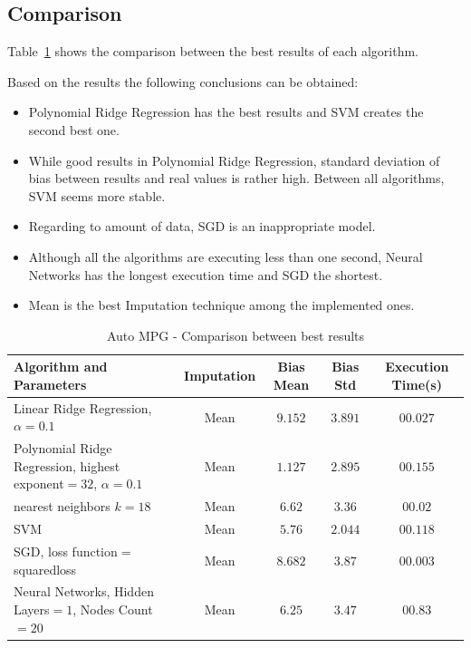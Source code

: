 \subsection{Comparison}
Table~\ref{table:db1-results} shows the comparison between the best results of each algorithm.

Based on the results the following conclusions can be obtained:
\begin{itemize}
  \item Polynomial Ridge Regression has the best results and SVM creates the second best one.
  \item While good results in Polynomial Ridge Regression, standard deviation of bias between results and real values is rather high. Between all algorithms, SVM seems more stable.
  \item Regarding to amount of data, SGD is an inappropriate model.
  \item Although all the algorithms are executing less than one second, Neural Networks has the longest execution time and SGD the shortest.
  \item Mean is the best Imputation technique among the implemented ones.
\end{itemize}

		\begin{table}
\begin{center}
\begin{tabular}{|p{4cm}|c|c|c|c|}
\hline Algorithm and Parameters & Imputation & Bias Mean & Bias Std & Execution Time(s)\\

\hline Linear Ridge Regression, $\alpha=0.1$ & Mean & $9.152$ & $3.891$ & $00.027$ \\

\hline Polynomial Ridge Regression, highest exponent$=32$, $\alpha=0.1$ & Mean & $\mathbf{1.127}$ & $2.895$ & $00.155$  \\

\hline nearest neighbors $k=18$ & Mean & $6.62$ & $3.36$ & $00.02$  \\

\hline SVM & Mean & $5.76$ & $\mathbf{2.044}$ & $00.118$  \\

\hline SGD, loss function$=$squaredloss & Mean & $8.682$ & $3.87$ & $\mathbf{00.003}$  \\

\hline Neural Networks, Hidden Layers$=1$, Nodes Count$=20$ & Mean & $6.25$ & $3.47$ & $00.83$  \\

\hline
\end{tabular}
    \caption{Auto MPG - Comparison between best results}
    \label{table:db1-results}
\end{center}
    \end{table}


